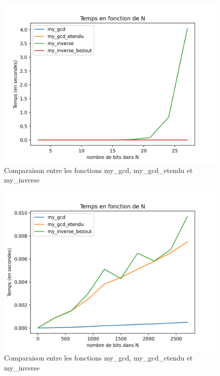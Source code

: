 \documentclass{article}
\begin{document}
\begin{minipage}{0.5\textwidth}
    \begin{figure}[H]
        \includegraphics[scale=0.5]{inverse_gcd.png}
        \caption{Comparaison entre les fonctions my\_gcd, my\_gcd\_etendu et my\_inverse}
        \label{rot1}
    \end{figure}
\end{minipage}
\hspace{2ex} 
\begin{minipage}{0.5\textwidth}
    \begin{figure}[H]
        \includegraphics[scale=0.5]{gcd_gcdetendu.png}
        \caption{Comparaison entre les fonctions my\_gcd, my\_gcd\_etendu et my\_inverse}
        \label{rot2}
    \end{figure}
\end{minipage}\\[0.5cm]
\end{document}
